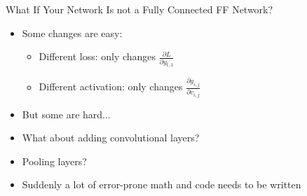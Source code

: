 \documentclass[aspectratio=169]{beamer}
\begin{document}
%

\begin{frame}{What If Your Network Is not a Fully Connected FF Network?}

\begin{itemize}
	\item Some changes are easy:
	\begin{itemize}
		\item Different loss: only changes $\frac{\partial L}{\partial y_{t,1}}$
		\item Different activation: only changes $\frac{\partial y_{i,j}}{\partial v_{i,j}}$
	\end{itemize}
	\item But some are hard...
	\item What about adding convolutional layers?
	\item Pooling layers?
	\item Suddenly a lot of error-prone math and code needs to be written
\end{itemize}
\end{frame}
\end{document}
